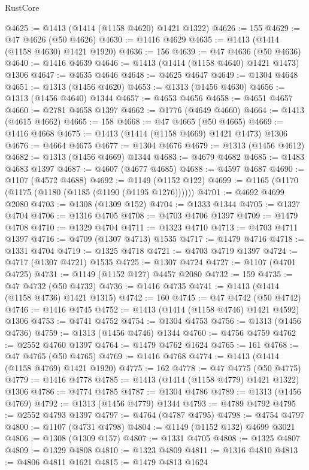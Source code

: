 \begin{lexlean}{RustCore}
\begin{coremodule}
@4625 := @1413 (@1414 (@1158 @4620) @1421 @1322)
@4626 := 155
@4629 := @47 @4626 (@50 @4626)
@4630 := @1416 @4629
@4635 := @1413 (@1414 (@1158 @4630) @1421 @1920)
@4636 := 156
@4639 := @47 @4636 (@50 @4636)
@4640 := @1416 @4639
@4646 := @1413 (@1414 (@1158 @4640) @1421 @1473) @1306
@4647 := @4635 @4646
@4648 := @4625 @4647
@4649 := @1304 @4648
@4651 := @1313 (@1456 @4620)
@4653 := @1313 (@1456 @4630)
@4656 := @1313 (@1456 @4640) @1344
@4657 := @4653 @4656
@4658 := @4651 @4657
@4660 := @2781 @4658 @1397
@4662 := @1776 (@4649 @4660)
@4664 := @1413 (@4615 @4662)
@4665 := 158
@4668 := @47 @4665 (@50 @4665)
@4669 := @1416 @4668
@4675 := @1413 (@1414 (@1158 @4669) @1421 @1473) @1306
@4676 := @4664 @4675
@4677 := @1304 @4676
@4679 := @1313 (@1456 @4612)
@4682 := @1313 (@1456 @4669) @1344
@4683 := @4679 @4682
@4685 := @1483 @4683 @1397
@4687 := @4607 (@4677 @4685)
@4688 := @4597 @4687
@4690 := @1107 (@4572 @4688)
@4692 := @1149 (@1152 @122)
@4699 := @1165 (@1170 (@1175 (@1180 (@1185 (@1190 (@1195 @1276))))))
@4701 := @4692 @4699 @2080
@4703 := @1308 (@1309 @152)
@4704 := @1333 @1344
@4705 := @1327 @4704
@4706 := @1316 @4705
@4708 := @4703 @4706 @1397
@4709 := @1479 @4708
@4710 := @1329 @4704
@4711 := @1323 @4710
@4713 := @4703 @4711 @1397
@4716 := @4709 (@1307 @4713) @1535
@4717 := @1479 @4716
@4718 := @1331 @4704
@4719 := @1325 @4718
@4721 := @4703 @4719 @1397
@4724 := @4717 (@1307 @4721) @1535
@4725 := @1307 @4724
@4727 := @1107 (@4701 @4725)
@4731 := @1149 (@1152 @127) @4457 @2080
@4732 := 159
@4735 := @47 @4732 (@50 @4732)
@4736 := @1416 @4735
@4741 := @1413 (@1414 (@1158 @4736) @1421 @1315)
@4742 := 160
@4745 := @47 @4742 (@50 @4742)
@4746 := @1416 @4745
@4752 := @1413 (@1414 (@1158 @4746) @1421 @4592) @1306
@4753 := @4741 @4752
@4754 := @1304 @4753
@4756 := @1313 (@1456 @4736)
@4759 := @1313 (@1456 @4746) @1344
@4760 := @4756 @4759
@4762 := @2552 @4760 @1397
@4764 := @1479 @4762 @1624
@4765 := 161
@4768 := @47 @4765 (@50 @4765)
@4769 := @1416 @4768
@4774 := @1413 (@1414 (@1158 @4769) @1421 @1920)
@4775 := 162
@4778 := @47 @4775 (@50 @4775)
@4779 := @1416 @4778
@4785 := @1413 (@1414 (@1158 @4779) @1421 @1322) @1306
@4786 := @4774 @4785
@4787 := @1304 @4786
@4789 := @1313 (@1456 @4769)
@4792 := @1313 (@1456 @4779) @1344
@4793 := @4789 @4792
@4795 := @2552 @4793 @1397
@4797 := @4764 (@4787 @4795)
@4798 := @4754 @4797
@4800 := @1107 (@4731 @4798)
@4804 := @1149 (@1152 @132) @4699 @3021
@4806 := @1308 (@1309 @157)
@4807 := @1331 @4705
@4808 := @1325 @4807
@4809 := @1329 @4808
@4810 := @1323 @4809
@4811 := @1316 @4810
@4813 := @4806 @4811 @1621
@4815 := @1479 @4813 @1624

\end{coremodule}
\end{lexlean}
